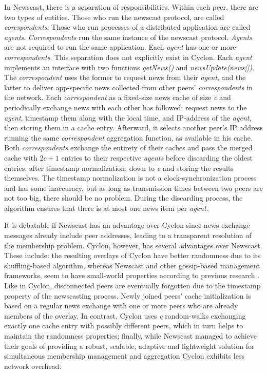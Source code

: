 \documentclass[runningheads]{llncs}
\begin{document}
In Newscast, there is a separation of responsibilities. Within each peer, there are two types of entities. Those who run the newscast protocol, are called \textit{corespondents}. Those who run processes of a distributed application are called \textit{agents}. \textit{Correspondents} run the same instance of the newscast protocol. \textit{Agents} are not required to run the same application. Each \textit{agent} has one or more \textit{correspondents}. This separation does not explicitly exist in Cyclon. Each \textit{agent} implements an interface with two functions \textit{getNews()} and \textit{newsUpdate(news[])}. The \textit{correspondent} uses the former to request news from their \textit{agent}, and the latter to deliver app-specific news collected from other peers' \textit{correspondents} in the network. Each \textit{correspondent} as a fixed-size news cache of size \textit{c} and periodically exchange news with each other has followed: request news to the \textit{agent}, timestamp them along with the local time, and IP-address of the \textit{agent}, then storing them in a cache entry. Afterward, it selects another peer's IP address running the same \textit{correspondent} aggregation function, as available in his cache. Both \textit{correspondents} exchange the entirety of their caches and pass the merged cache with $2c+1$ entries to their respective \textit{agents} before discarding the oldest entries, after timestamp normalization, down to \textit{c} and storing the results themselves. The timestamp normalization is not a clock-synchronization process and has some inaccuracy, but as long as transmission times between two peers are not too big, there should be no problem. During the discarding process, the algorithm ensures that there is at most one news item per \textit{agent}.

It is debatable if Newscast has an advantage over Cyclon since news exchange messages already include peer addresses, leading to a transparent resolution of the membership problem. Cyclon, however, has several advantages over Newscast. These include: the resulting overlays of Cyclon have better randomness due to its shuffling-based algorithm, whereas Newscast and other gossip-based management frameworks, seem to have small-world properties according to previous research \cite{eval-gossip-based}. Like in Cyclon, disconnected peers are eventually forgotten due to the timestamp property of the newscasting process. Newly joined peers' cache initialization is based on a regular news exchange with one or more peers who are already members of the overlay. In contrast, Cyclon uses \textit{c} random-walks exchanging exactly one cache entry with possibly different peers, which in turn helps to maintain the randomness properties; finally, while Newscast managed to achieve their goals of providing a robust, scalable, adaptive and lightweight solution for simultaneous membership management and aggregation Cyclon exhibits less network overhead\cite{cyclon}.
\end{document}
